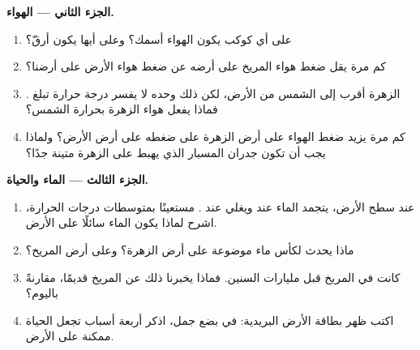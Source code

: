 \begin{problem}
\medskip
\noindent\textbf{الجزء الثاني --- الهواء.}
\begin{enumerate}[resume]
  \item على أي كوكب يكون الهواء أسمك؟ وعلى أيها يكون
        أرقّ؟
  \item كم مرة يقل ضغط هواء المريخ على أرضه عن ضغط
        هواء الأرض على أرضنا؟
  \item الزهرة أقرب إلى الشمس من الأرض، لكن ذلك وحده لا
        يفسر درجة حرارة تبلغ . فماذا يفعل هواء الزهرة
        بحرارة الشمس؟
  \item كم مرة يزيد ضغط الهواء على أرض الزهرة على ضغطه على
        أرض الأرض؟ ولماذا يجب أن تكون جدران المسبار الذي يهبط على الزهرة متينة جدًا؟
\end{enumerate}

\medskip
\noindent\textbf{الجزء الثالث --- الماء والحياة.}
\begin{enumerate}[resume]
  \item عند سطح الأرض، يتجمد الماء عند  ويغلي عند
        . مستعينًا بمتوسطات درجات الحرارة، اشرح لماذا يكون الماء
        سائلًا على الأرض.
  \item ماذا يحدث لكأس ماء موضوعة على أرض
        الزهرة؟ وعلى أرض المريخ؟
  \item كانت في المريخ   قبل مليارات السنين. فماذا يخبرنا
        ذلك عن  المريخ قديمًا، مقارنةً باليوم؟
  \item اكتب ظهر بطاقة الأرض البريدية: في بضع جمل، اذكر
        أربعة أسباب تجعل الحياة ممكنة على الأرض.
\end{enumerate}
\end{problem}
